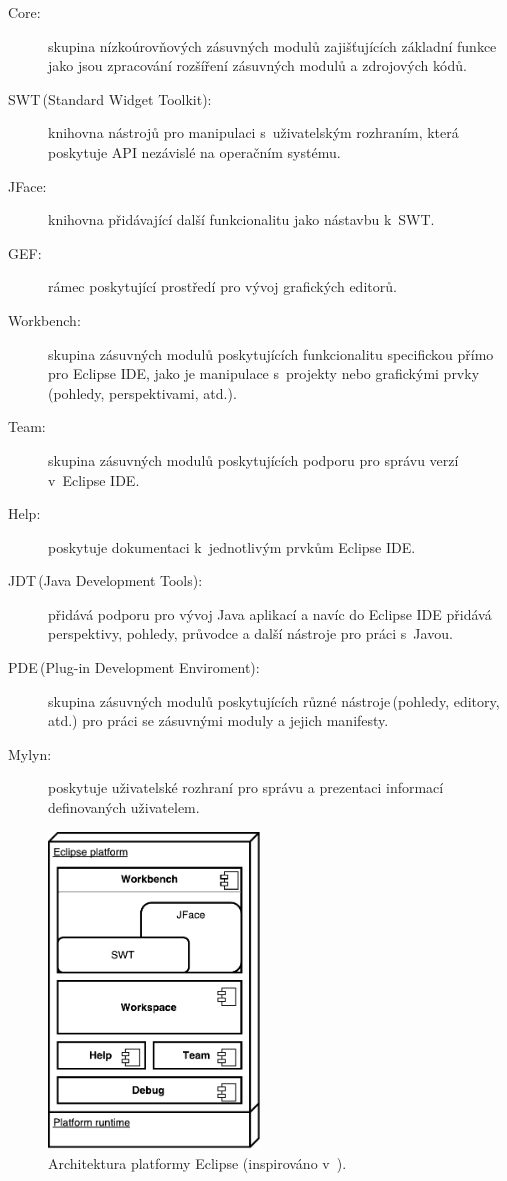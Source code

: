   \begin{description}
    \item[Core:] skupina nízkoúrovňových zásuvných modulů zajišťujících základní funkce jako jsou zpracování rozšíření zásuvných modulů a zdrojových kódů.
    \item[SWT\,(Standard Widget Toolkit):] knihovna nástrojů pro manipulaci s~uživatelským rozhraním, která poskytuje API nezávislé na operačním systému.
    \item[JFace:] knihovna přidávající další funkcionalitu jako nástavbu k~SWT.
    \item[GEF:] rámec poskytující prostředí pro vývoj grafických editorů.
    \item[Workbench:] skupina zásuvných modulů poskytujících funkcionalitu specifickou přímo pro Eclipse IDE, jako je manipulace s~projekty nebo grafickými prvky (pohledy, perspektivami, atd.).
    \item[Team:] skupina zásuvných modulů poskytujících podporu pro správu verzí v~Eclipse IDE.
    \item[Help:] poskytuje dokumentaci k~jednotlivým prvkům Eclipse IDE.
    \item[JDT\,(Java Development Tools)\footnotemark:]  přidává podporu pro vývoj Java aplikací a navíc do Eclipse IDE přidává perspektivy, pohledy, průvodce a další nástroje pro práci s~Javou.
    \item[PDE\,(Plug-in Development Enviroment)\footnotemark:]  skupina zásuvných modulů poskytujících různé nástroje\,(pohledy, editory, atd.) pro práci se zásuvnými moduly a jejich manifesty.
    \item[Mylyn:] poskytuje uživatelské rozhraní pro správu a prezentaci informací definovaných uživatelem.
  \end{description}

  \begin{figure}
    \includegraphics[width=0.5\textwidth, center]{obrazky-figures/eclipse_arch.pdf}
    \caption[Architektura platformy Eclipse.]{Architektura platformy Eclipse (inspirováno v~\cite{eclipse-platform}).}
    \label{fig:eclipse_arch}
  \end{figure}

